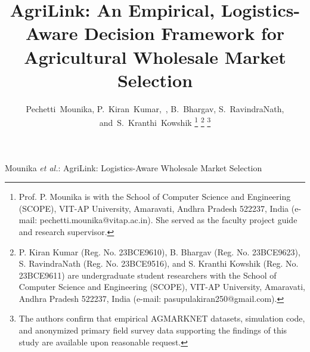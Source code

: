 \documentclass[journal]{IEEEtran}
\begin{document}
\title{AgriLink: An Empirical, Logistics-Aware Decision Framework for Agricultural Wholesale Market Selection}

\author{Pechetti~Mounika,
        P.~Kiran~Kumar,~,
        B.~Bhargav,
        S.~RavindraNath,
        and~S.~Kranthi~Kowshik%
\thanks{Prof. P. Mounika is with the School of Computer Science and Engineering (SCOPE), VIT-AP University, Amaravati, Andhra Pradesh 522237, India (e-mail: pechetti.mounika@vitap.ac.in). She served as the faculty project guide and research supervisor.}%
\thanks{P. Kiran Kumar (Reg. No. 23BCE9610), B. Bhargav (Reg. No. 23BCE9623), S. RavindraNath (Reg. No. 23BCE9516), and S. Kranthi Kowshik (Reg. No. 23BCE9611) are undergraduate student researchers with the School of Computer Science and Engineering (SCOPE), VIT-AP University, Amaravati, Andhra Pradesh 522237, India (e-mail: pasupulakiran250@gmail.com).}%
\thanks{The authors confirm that empirical AGMARKNET datasets, simulation code, and anonymized primary field survey data supporting the findings of this study are available upon reasonable request.}%
}

%
{Mounika \MakeLowercase{\textit{et al.}}: AgriLink: Logistics-Aware Wholesale Market Selection}

\maketitle
\end{document}
